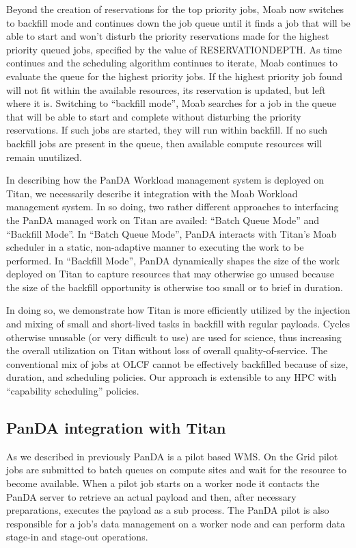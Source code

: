 Beyond the creation of reservations for the top priority jobs, Moab now
switches to backfill mode and continues down the job queue until it finds a job
that will be able to start and won't disturb the priority reservations made for
the highest priority queued jobs, specified by the value of RESERVATIONDEPTH.
As time continues and the scheduling algorithm continues to iterate, Moab
continues to evaluate the queue for the highest priority jobs. If the highest
priority job found will not fit within the available resources, its reservation
is updated, but left where it is. Switching to ``backfill mode'', Moab searches
for a job in the queue that will be able to start and complete without
disturbing the priority reservations.  If such jobs are started, they will run
within backfill.  If no such backfill jobs are present in the queue, then
available compute resources will remain unutilized.

In describing how the PanDA Workload management system is deployed on Titan, we
necessarily describe it integration with the Moab Workload management system.
In so doing, two rather different approaches to interfacing the PanDA managed
work on Titan are availed: ``Batch Queue Mode'' and ``Backfill Mode''.  In
``Batch Queue Mode'', PanDA interacts with Titan's Moab scheduler in a static,
non-adaptive manner to executing the work to be performed.  In ``Backfill
Mode'', PanDA  dynamically shapes the size of the work deployed on Titan to
capture resources that may otherwise go unused because the size of the backfill
opportunity is otherwise too small or to brief in duration.

In doing so, we demonstrate how Titan is more efficiently utilized by the
injection and mixing of small and short-lived tasks in backfill with regular
payloads. Cycles otherwise unusable (or very difficult to use) are used for
science, thus increasing the overall utilization on Titan without loss of
overall quality-of-service. The conventional mix of jobs at OLCF cannot be
effectively backfilled because of size, duration, and scheduling policies. Our
approach is extensible to any HPC with ``capability scheduling'' policies. 

\subsection{PanDA integration with Titan}
\label{subsec:integration}

As we described in previously PanDA is a pilot based WMS. On the Grid pilot
jobs are submitted to batch queues on compute sites and wait for the resource
to become available. When a pilot job starts on a worker node it contacts the
PanDA server to retrieve an actual payload and then, after necessary
preparations, executes the payload as a sub process. The PanDA pilot is also
responsible for a job's data management on a worker node and can perform data
stage-in and stage-out operations. 

